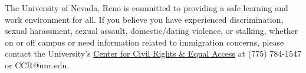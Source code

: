 The University of Nevada, Reno is committed to providing a safe learning and work
environment for all. If you believe you have experienced discrimination, sexual
harassment, sexual assault, domestic/dating violence, or stalking, whether on or
off campus or need information related to immigration concerns, please contact
the University's \href{https://www.unr.edu/civil-rights}{Center for Civil Rights
\& Equal Access} at (775) 784-1547 or CCR@unr.edu.
